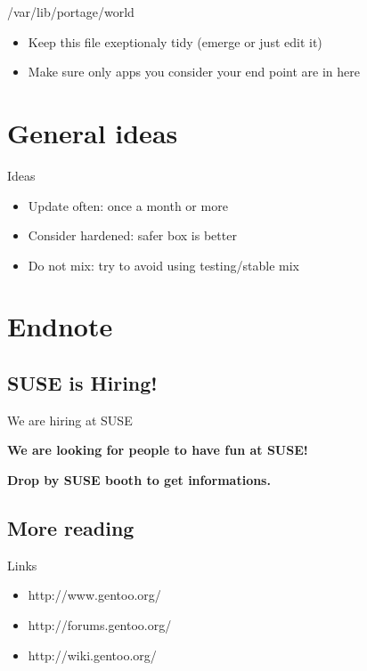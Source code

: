 \documentclass{beamer}
\begin{document}
\begin{frame}{/var/lib/portage/world}
	\begin{itemize}
	\item Keep this file exeptionaly tidy (emerge or just edit it)
	\item Make sure only apps you consider your end point are in here
	\end{itemize}
\end{frame}

\section{General ideas}

\begin{frame}{Ideas}
	\begin{itemize}
	\item Update often: once a month or more
	\item Consider hardened: safer box is better
	\item Do not mix: try to avoid using testing/stable mix
	\end{itemize}
\end{frame}

\section{Endnote}

\subsection{SUSE is Hiring!}

\begin{frame}{We are hiring at SUSE}
	\begin{center}\bf{We are looking for people to have fun at SUSE!}\end{center}
	\begin{center}\bf{Drop by SUSE booth to get informations.}\end{center}
\end{frame}

\subsection{More reading}
\begin{frame}{Links}
	\begin{itemize}
		\item http://www.gentoo.org/
		\item http://forums.gentoo.org/
		\item http://wiki.gentoo.org/
	\end{itemize}
\end{frame}
\end{document}
